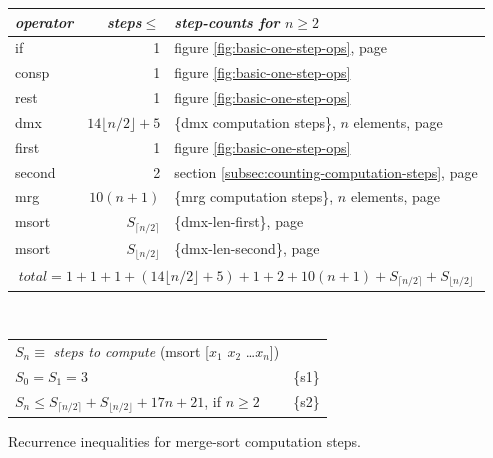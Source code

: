\begin{figure}
\begin{center}
\begin{spacing}{0.9}
\begin{tabular}{lrl}
  \emph{operator} & \emph{steps}$\leq$ & \emph{step-counts for} $n \geq 2$\\
  \hline
   \textsf{if}     & 1 & figure \ref{fig:basic-one-step-ops}, page \pageref{fig:basic-one-step-ops}  \\
   \textsf{consp}  & 1 & figure \ref{fig:basic-one-step-ops}  \\
   \textsf{rest}   & 1 & figure \ref{fig:basic-one-step-ops} \\
   \textsf{dmx}    & $14\lfloor n/2\rfloor + 5$ & \{dmx computation steps\}, $n$ elements, page \pageref{fig:dmx-computation-time}\\
   \textsf{first}  & 1 & figure \ref{fig:basic-one-step-ops} \\
   \textsf{second} & 2 & section \ref{subsec:counting-computation-steps}, page \pageref{steps-in-second-op} \\
   \textsf{mrg}    & $10(n+1)$ & \{mrg computation steps\}, $n$ elements, page \pageref{thm:mrg-computation-time}\\
   \textsf{msort}  & $S_{\lceil  n/2 \rceil}$  & \{dmx-len-first\}, page \pageref{thm:dmx-length-first-second} \\
   \textsf{msort}  & $S_{\lfloor n/2 \rfloor}$ & \{dmx-len-second\}, page \pageref{thm:dmx-length-first-second} \vspace{5pt} \\
   \hline
	\multicolumn{3}{c}{$total = 1+1+1+(14\lfloor n/2\rfloor+5)+1+2+10(n+1)+S_{\lceil n/2\rceil}+S_{\lfloor n/2\rfloor}$} \vspace{1pt} \\
   \hline
\end{tabular}
\end{spacing}
~\vspace{2mm}\\
\begin{tabular}{ll}
   $S_n \equiv$ \emph{steps to compute} \textsf{(msort [$x_1$ $x_2$ \dots $x_n$])} \\
   $S_0 = S_1 = 3$ & \{s1\}\\
   $S_{n} \leq S_{\lceil n/2 \rceil} + S_{\lfloor n/2 \rfloor} + 17n + 21$, if $n \geq 2$ & \{s2\}\\
\end{tabular}
\end{center}
\caption{Recurrence inequalities for merge-sort computation steps.}
\label{msort-recurrences}
\end{figure}

